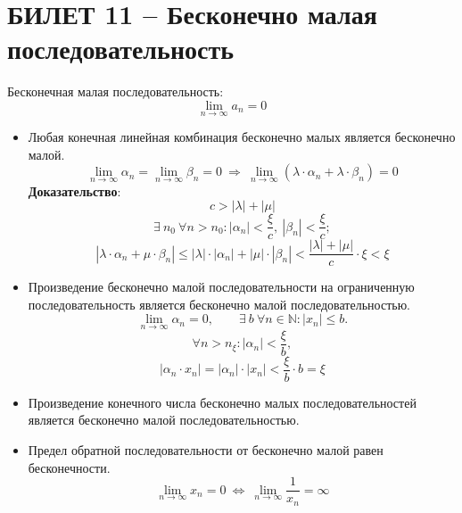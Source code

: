 \documentclass{article}
\newcommand{\numberset}[1]{\mathbb{#1}}
\newcommand{\N}{\numberset{N}}
\begin{document}
\section{БИЛЕТ 11 -- Бесконечно малая последовательность}
Бесконечная малая последовательность:
$$ \lim_{n\to\infty} a_{n} = 0 $$
\begin{itemize}
    \item Любая конечная линейная комбинация бесконечно малых является бесконечно малой.
    $$ \lim_{n\to\infty} \alpha_{n} = \lim_{n\to\infty} \beta_{n}=0\:\Rightarrow\:\lim_{n\to\infty} (\lambda\cdot \alpha_{n}+\lambda\cdot\beta_{n})=0 $$
    \textbf{Доказательство}:
    $$ c>|\lambda|+|\mu| $$
    $$ \exists\:n_{0}\:\forall n>n_{0}:|\alpha_{n}|<\frac{\xi}{c}, \:|\beta_{n}|<\frac{\xi}{c};$$
    $$ |\lambda\cdot\alpha_{n}+\mu\cdot\beta_{n}|\leqslant |\lambda|\cdot|\alpha_{n}|+|\mu|\cdot|\beta_{n}|<\frac{|\lambda|+|\mu|}{c}\cdot\xi<\xi $$
    \item Произведение бесконечно малой последовательности на ограниченную последовательность является бесконечно малой последовательностью.
    $$ \lim_{n\to\infty}\alpha_{n}=0,\qquad \exists\:b\:\forall n\in\N:|x_{n}|\leqslant b.$$
    $$ \forall n>n_{\xi}:|\alpha_{n}|<\frac{\xi}{b}, $$
    $$ |\alpha_{n}\cdot x_{n}|=|\alpha_{n}|\cdot|x_{n}|<\frac{\xi}{b}\cdot b=\xi $$
    \item Произведение конечного числа бесконечно малых последовательностей является бесконечно малой последовательностью.
    \item Предел обратной последовательности от бесконечно малой равен бесконечности.
    $$\lim_{n\to\infty}x_{n}=0\:\Leftrightarrow\:\lim_{n\to\infty}\frac{1}{x_{n}}=\infty$$
\end{itemize}
\newpage
\end{document}
